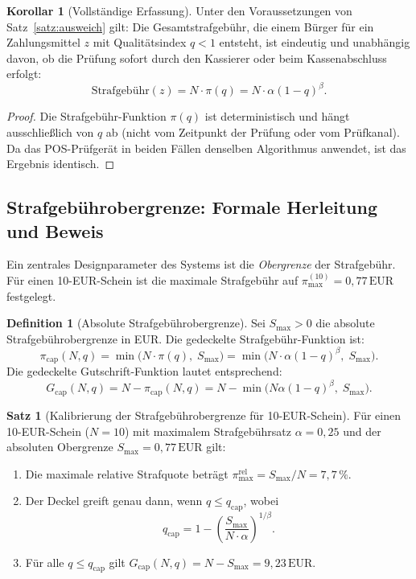 ﻿\documentclass[a4paper,12pt]{article}
\theoremstyle{definition}
\newtheorem{definition}{Definition}
\newtheorem{satz}{Satz}
\newtheorem{korollar}{Korollar}
\begin{document}
\begin{korollar}[Vollständige Erfassung]
\label{kor:vollständig}
Unter den Voraussetzungen von Satz~\ref{satz:ausweich} gilt:
Die Gesamtstrafgebühr, die einem Bürger für ein Zahlungsmittel $z$
mit Qualitätsindex $q < 1$ entsteht, ist eindeutig und unabhängig davon,
ob die Prüfung sofort durch den Kassierer oder beim Kassenabschluss erfolgt:
\[
\text{Strafgebühr}(z) = N \cdot \pi(q) = N \cdot \alpha(1-q)^{\beta}.
\]
\end{korollar}

\begin{proof}
Die Strafgebühr-Funktion $\pi(q)$ ist deterministisch und hängt ausschließlich
von $q$ ab (nicht vom Zeitpunkt der Prüfung oder vom Prüfkanal).
Da das POS-Prüfgerät in beiden Fällen denselben Algorithmus anwendet,
ist das Ergebnis identisch.
\end{proof}

\subsection{Strafgebührobergrenze: Formale Herleitung und Beweis}

Ein zentrales Designparameter des Systems ist die \emph{Obergrenze} der
Strafgebühr.  Für einen 10-EUR-Schein ist die maximale Strafgebühr auf
$\pi_{\max}^{(10)} = 0{,}77\,\text{EUR}$ festgelegt.

\begin{definition}[Absolute Strafgebührobergrenze]
\label{def:strafdeckel}
Sei $S_{\max} > 0$ die absolute Strafgebührobergrenze in EUR.
Die gedeckelte Strafgebühr-Funktion ist:
\[
\pi_{\text{cap}}(N, q) = \min\bigl(N \cdot \pi(q),\; S_{\max}\bigr)
= \min\bigl(N \cdot \alpha(1-q)^{\beta},\; S_{\max}\bigr).
\]
Die gedeckelte Gutschrift-Funktion lautet entsprechend:
\[
G_{\text{cap}}(N, q) = N - \pi_{\text{cap}}(N, q) = N - \min\bigl(N\alpha(1-q)^{\beta},\; S_{\max}\bigr).
\]
\end{definition}

\begin{satz}[Kalibrierung der Strafgebührobergrenze für 10-EUR-Schein]
\label{satz:deckel}
Für einen 10-EUR-Schein ($N = 10$) mit maximalem Strafgebührsatz $\alpha = 0{,}25$
und der absoluten Obergrenze $S_{\max} = 0{,}77\,\text{EUR}$ gilt:
\begin{enumerate}
  \item Die maximale relative Strafquote beträgt $\pi_{\max}^{\text{rel}} = S_{\max}/N = 7{,}7\,\%$.
  \item Der Deckel greift genau dann, wenn $q \leq q_{\text{cap}}$, wobei
        \[
        q_{\text{cap}} = 1 - \left(\frac{S_{\max}}{N \cdot \alpha}\right)^{1/\beta}.
        \]
  \item Für alle $q \leq q_{\text{cap}}$ gilt $G_{\text{cap}}(N,q) = N - S_{\max} = 9{,}23\,\text{EUR}$.
\end{enumerate}
\end{satz}
\end{document}
